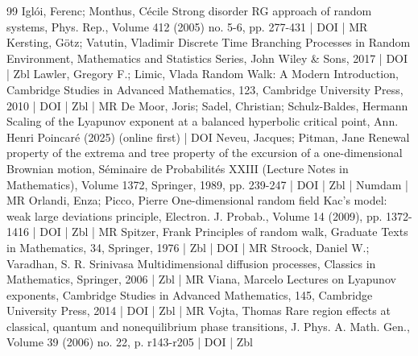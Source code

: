 \begin{thebibliography}{99}
 Iglói, Ferenc; Monthus, Cécile Strong disorder RG approach of random systems, Phys. Rep., Volume 412 (2005) no. 5-6, pp. 277-431 | DOI | MR
 Kersting, Götz; Vatutin, Vladimir Discrete Time Branching Processes in Random Environment, Mathematics and Statistics Series, John Wiley \& Sons, 2017 | DOI | Zbl
 Lawler, Gregory F.; Limic, Vlada Random Walk: A Modern Introduction, Cambridge Studies in Advanced Mathematics, 123, Cambridge University Press, 2010 | DOI | Zbl | MR
 De Moor, Joris; Sadel, Christian; Schulz-Baldes, Hermann Scaling of the Lyapunov exponent at a balanced hyperbolic critical point, Ann. Henri Poincaré (2025) (online first) | DOI
 Neveu, Jacques; Pitman, Jane Renewal property of the extrema and tree property of the excursion of a one-dimensional Brownian motion, Séminaire de Probabilités XXIII (Lecture Notes in Mathematics), Volume 1372, Springer, 1989, pp. 239-247 | DOI | Zbl | Numdam | MR
 Orlandi, Enza; Picco, Pierre One-dimensional random field Kac’s model: weak large deviations principle, Electron. J. Probab., Volume 14 (2009), pp. 1372-1416 | DOI | Zbl | MR
 Spitzer, Frank Principles of random walk, Graduate Texts in Mathematics, 34, Springer, 1976 | Zbl | DOI | MR
 Stroock, Daniel W.; Varadhan, S. R. Srinivasa Multidimensional diffusion processes, Classics in Mathematics, Springer, 2006 | Zbl | MR
 Viana, Marcelo Lectures on Lyapunov exponents, Cambridge Studies in Advanced Mathematics, 145, Cambridge University Press, 2014 | DOI | Zbl | MR
 Vojta, Thomas Rare region effects at classical, quantum and nonequilibrium phase transitions, J. Phys. A. Math. Gen., Volume 39 (2006) no. 22, p. r143-r205 | DOI | Zbl
\end{thebibliography}
